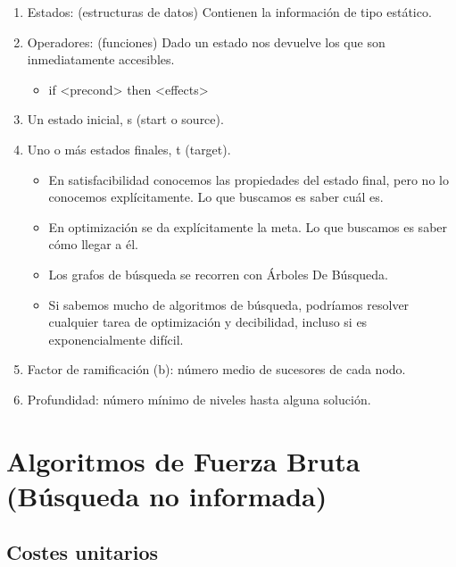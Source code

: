 \documentclass[12pt, twoside, openright]{report} %
\begin{document}
  \begin{enumerate}

  \item
    Estados: (estructuras de datos) Contienen la información de tipo
    estático.
  \item
    Operadores: (funciones) Dado un estado nos devuelve los que son
    inmediatamente accesibles.

    \begin{itemize}
  
    \item
      if <precond> then <effects>
    \end{itemize}
  \item
    Un estado inicial, s (start o source).
  \item
    Uno o más estados finales, t (target).

    \begin{itemize}
    \item
      En satisfacibilidad conocemos las propiedades del estado final, pero
      no lo conocemos explícitamente. Lo que buscamos es saber cuál es.
    \item
      En optimización se da explícitamente la meta. Lo que buscamos es
      saber cómo llegar a él.
    \item
      Los grafos de búsqueda se recorren con Árboles De Búsqueda.
    \item
      Si sabemos mucho de algoritmos de búsqueda, podríamos resolver
      cualquier tarea de optimización y decibilidad, incluso si es
      exponencialmente difícil.
    \end{itemize}
  \item
    Factor de ramificación (b): número medio de sucesores de cada nodo.
  \item
    Profundidad: número mínimo de niveles hasta alguna solución.
  \end{enumerate}

\section{Algoritmos de Fuerza Bruta (Búsqueda no informada)}
\subsection{Costes unitarios}
\end{document}
